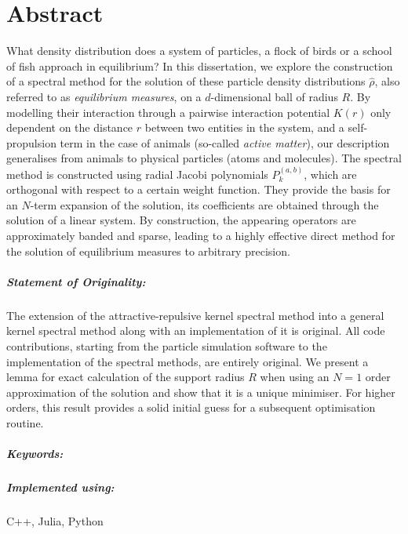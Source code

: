 \chapter*{Abstract}
\label{chap:abstract}
What density distribution does a system of particles, a flock of birds or a school of fish approach in equilibrium?
In this dissertation, we explore the construction of a spectral method for the solution of these particle density distributions $\hat{\rho}$, also referred to as \textit{equilibrium measures}, on a $d$-dimensional ball of radius $R$.
By modelling their interaction through a pairwise interaction potential $K(r)$ only dependent on the distance $r$ between two entities in the system, and a self-propulsion term in the case of animals (so-called \textit{active matter}), our description generalises from animals to physical particles (atoms and molecules).
The spectral method is constructed using radial Jacobi polynomials $P_k^{(a,b)}$, which are orthogonal with respect to a certain weight function.
They provide the basis for an $N$-term expansion of the solution, its coefficients are obtained through the solution of a linear system.
By construction, the appearing operators are approximately banded and sparse, leading to a highly effective direct method for the solution of equilibrium measures to arbitrary precision.

\paragraph{Statement of Originality:}
The extension of the attractive-repulsive kernel spectral method into a general kernel spectral method along with an implementation of it is original.
All code contributions, starting from the particle simulation software to the implementation of the spectral methods, are entirely original.
We present a lemma for exact calculation of the support radius $R$ when using an $N = 1$ order approximation of the solution and show that it is a unique minimiser.
For higher orders, this result provides a solid initial guess for a subsequent optimisation routine.

\paragraph{Keywords:}
\thesiskeywords

\paragraph{Implemented using:}
C++, Julia, Python
